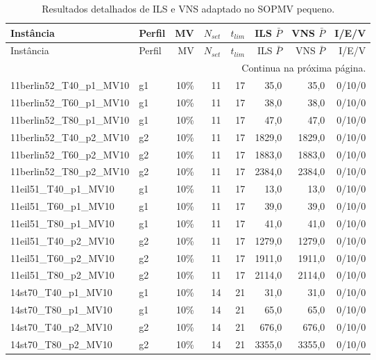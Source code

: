 \footnotesize
\begin{longtable}{llrrrrrr}
\caption{Resultados detalhados de ILS e VNS adaptado no SOPMV pequeno.}\label{tab:appendix-sopmv-small-detail}\\
\toprule
Inst\^ancia & Perfil & MV & $N_{set}$ & $t_{lim}$ & ILS $\bar P$ & VNS $\bar P$ & I/E/V \\
\midrule
\endfirsthead
\toprule
Inst\^ancia & Perfil & MV & $N_{set}$ & $t_{lim}$ & ILS $\bar P$ & VNS $\bar P$ & I/E/V \\
\midrule
\endhead
\midrule
\multicolumn{8}{r}{\footnotesize Continua na pr\'oxima p\'agina.}\\
\endfoot
\bottomrule
\endlastfoot
11berlin52\_T40\_p1\_MV10 & g1 & 10\% & 11 & 17 & 35{,}0 & 35{,}0 & 0/10/0 \\
11berlin52\_T60\_p1\_MV10 & g1 & 10\% & 11 & 17 & 38{,}0 & 38{,}0 & 0/10/0 \\
11berlin52\_T80\_p1\_MV10 & g1 & 10\% & 11 & 17 & 47{,}0 & 47{,}0 & 0/10/0 \\
11berlin52\_T40\_p2\_MV10 & g2 & 10\% & 11 & 17 & 1829{,}0 & 1829{,}0 & 0/10/0 \\
11berlin52\_T60\_p2\_MV10 & g2 & 10\% & 11 & 17 & 1883{,}0 & 1883{,}0 & 0/10/0 \\
11berlin52\_T80\_p2\_MV10 & g2 & 10\% & 11 & 17 & 2384{,}0 & 2384{,}0 & 0/10/0 \\
11eil51\_T40\_p1\_MV10 & g1 & 10\% & 11 & 17 & 13{,}0 & 13{,}0 & 0/10/0 \\
11eil51\_T60\_p1\_MV10 & g1 & 10\% & 11 & 17 & 39{,}0 & 39{,}0 & 0/10/0 \\
11eil51\_T80\_p1\_MV10 & g1 & 10\% & 11 & 17 & 41{,}0 & 41{,}0 & 0/10/0 \\
11eil51\_T40\_p2\_MV10 & g2 & 10\% & 11 & 17 & 1279{,}0 & 1279{,}0 & 0/10/0 \\
11eil51\_T60\_p2\_MV10 & g2 & 10\% & 11 & 17 & 1911{,}0 & 1911{,}0 & 0/10/0 \\
11eil51\_T80\_p2\_MV10 & g2 & 10\% & 11 & 17 & 2114{,}0 & 2114{,}0 & 0/10/0 \\
14st70\_T40\_p1\_MV10 & g1 & 10\% & 14 & 21 & 31{,}0 & 31{,}0 & 0/10/0 \\
14st70\_T80\_p1\_MV10 & g1 & 10\% & 14 & 21 & 65{,}0 & 65{,}0 & 0/10/0 \\
14st70\_T40\_p2\_MV10 & g2 & 10\% & 14 & 21 & 676{,}0 & 676{,}0 & 0/10/0 \\
14st70\_T80\_p2\_MV10 & g2 & 10\% & 14 & 21 & 3355{,}0 & 3355{,}0 & 0/10/0 \\

\end{longtable}
